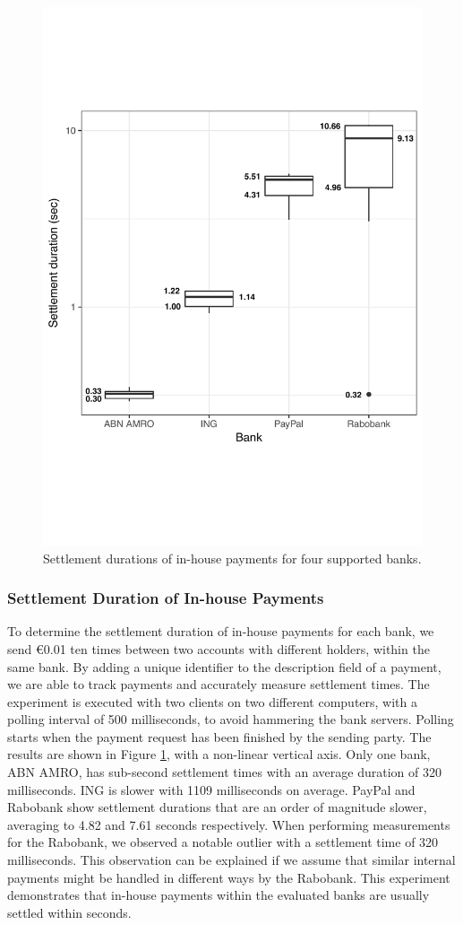 \begin{figure}[t]
	\centering
	\includegraphics[width=.7\linewidth]{iom/assets/intrabank_annotated}
	\caption{Settlement durations of in-house payments for four supported banks.}
	\label{fig:intrabank_speed}
\end{figure}

\subsubsection*{Settlement Duration of In-house Payments}
\label{sec:settlement_inhouse_experiment}
To determine the settlement duration of in-house payments for each bank, we send \euro 0.01 ten times between two accounts with different holders, within the same bank.
By adding a unique identifier to the description field of a payment, we are able to track payments and accurately measure settlement times.
The experiment is executed with two clients on two different computers, with a polling interval of 500 milliseconds, to avoid hammering the bank servers.
Polling starts when the payment request has been finished by the sending party.
The results are shown in Figure \ref{fig:intrabank_speed}, with a non-linear vertical axis.
Only one bank, ABN AMRO, has sub-second settlement times with an average duration of 320 milliseconds.
ING is slower with 1109 milliseconds on average.
PayPal and Rabobank show settlement durations that are an order of magnitude slower, averaging to 4.82 and 7.61 seconds respectively.
When performing measurements for the Rabobank, we observed a notable outlier with a settlement time of 320 milliseconds.
This observation can be explained if we assume that similar internal payments might be handled in different ways by the Rabobank.
This experiment demonstrates that in-house payments within the evaluated banks are usually settled within seconds.

